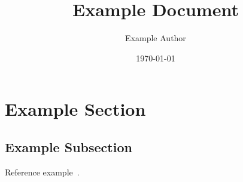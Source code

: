 \documentclass[12pt]{article}
\title{Example Document}
\author{Example Author}
\date{\today}
\begin{document}
\maketitle

\tableofcontents

\section{Example Section}

\subsection{Example Subsection}

Reference example~\cite{Example_2024}.
\blindtext{}

\printbibliography{}
\end{document}
